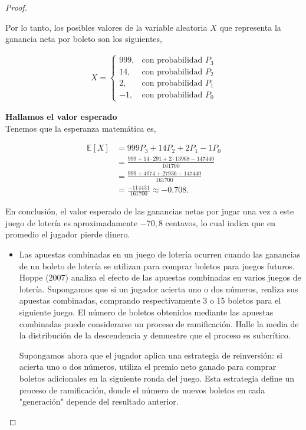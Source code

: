 \documentclass{article}
\begin{document}
\begin{proof}
\begin{itemize}
Por lo tanto, los posibles valores de la variable aleatoria \( X \) que representa la ganancia neta por boleto son los siguientes,

\begin{align*}
X = \begin{cases}
999, & \text{con probabilidad } P_3 \\
14, & \text{con probabilidad } P_2 \\
2, & \text{con probabilidad } P_1 \\
-1, & \text{con probabilidad } P_0
\end{cases}
\end{align*}

\textbf{Hallamos el valor esperado} \\
Tenemos que la esperanza matemática es,

\begin{align*}
\mathbb{E}[X] &= 999 P_3 + 14 P_2 + 2 P_1 - 1 P_0 \\
&= \frac{999 + 14 \cdot 291 + 2 \cdot 13968 - 147440}{161700} \\
&= \frac{999 + 4074 + 27936 - 147440}{161700} \\
&= \frac{-114431}{161700} \approx -0.708.
\end{align*}

En conclusión, el valor esperado de las ganancias netas por jugar una vez a este juego de lotería es aproximadamente \(-70{,}8\) centavos, lo cual indica que en promedio el jugador pierde dinero.

\end{itemize}

\begin{itemize}

\item[(b)] Las apuestas combinadas en un juego de lotería ocurren cuando las ganancias de un boleto de lotería se utilizan para comprar boletos para juegos futuros. Hoppe (2007) analiza el efecto de las apuestas combinadas en varios juegos de lotería. Supongamos que si un jugador acierta uno o dos números, realiza sus apuestas combinadas, comprando respectivamente 3 o 15 boletos para el siguiente juego. El número de boletos obtenidos mediante las apuestas combinadas puede considerarse un proceso de ramificación. Halle la media de la distribución de la descendencia y demuestre que el proceso es subcrítico.


Supongamos ahora que el jugador aplica una estrategia de reinversión: si acierta uno o dos números, utiliza el premio neto ganado para comprar boletos adicionales en la siguiente ronda del juego. Esta estrategia define un proceso de ramificación, donde el número de nuevos boletos en cada "generación" depende del resultado anterior.


\end{itemize}
\end{proof}
\end{document}
